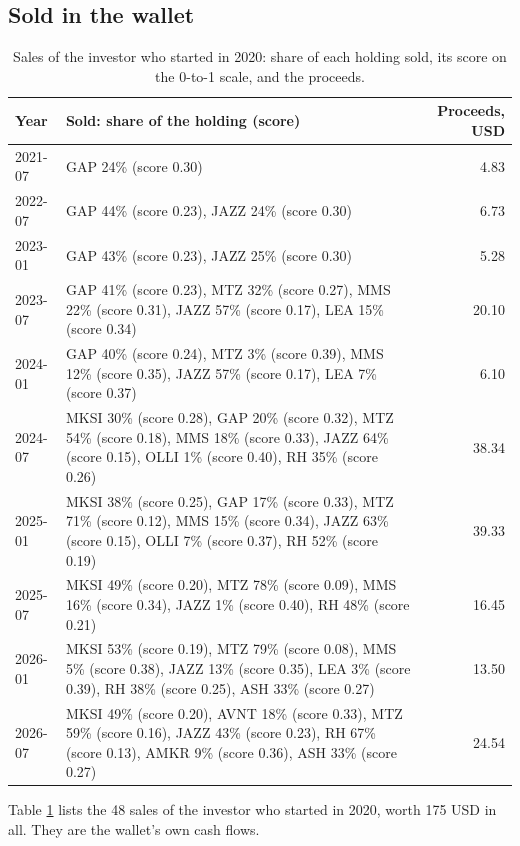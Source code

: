 \documentclass[11pt,a4paper]{article}
\begin{document}
\subsection{Sold in the wallet}
\begin{table}[H]
\centering
\small
\caption{Sales of the investor who started in 2020: share of each holding sold, its score on the 0-to-1 scale, and the proceeds.}\label{tab:sales}
\begin{tabular}{l p{11cm} r}
\hline
Year & Sold: share of the holding (score) & Proceeds, USD \\
\hline
2021-07 & GAP 24\% (score 0.30) & 4.83 \\
2022-07 & GAP 44\% (score 0.23), JAZZ 24\% (score 0.30) & 6.73 \\
2023-01 & GAP 43\% (score 0.23), JAZZ 25\% (score 0.30) & 5.28 \\
2023-07 & GAP 41\% (score 0.23), MTZ 32\% (score 0.27), MMS 22\% (score 0.31), JAZZ 57\% (score 0.17), LEA 15\% (score 0.34) & 20.10 \\
2024-01 & GAP 40\% (score 0.24), MTZ 3\% (score 0.39), MMS 12\% (score 0.35), JAZZ 57\% (score 0.17), LEA 7\% (score 0.37) & 6.10 \\
2024-07 & MKSI 30\% (score 0.28), GAP 20\% (score 0.32), MTZ 54\% (score 0.18), MMS 18\% (score 0.33), JAZZ 64\% (score 0.15), OLLI 1\% (score 0.40), RH 35\% (score 0.26) & 38.34 \\
2025-01 & MKSI 38\% (score 0.25), GAP 17\% (score 0.33), MTZ 71\% (score 0.12), MMS 15\% (score 0.34), JAZZ 63\% (score 0.15), OLLI 7\% (score 0.37), RH 52\% (score 0.19) & 39.33 \\
2025-07 & MKSI 49\% (score 0.20), MTZ 78\% (score 0.09), MMS 16\% (score 0.34), JAZZ 1\% (score 0.40), RH 48\% (score 0.21) & 16.45 \\
2026-01 & MKSI 53\% (score 0.19), MTZ 79\% (score 0.08), MMS 5\% (score 0.38), JAZZ 13\% (score 0.35), LEA 3\% (score 0.39), RH 38\% (score 0.25), ASH 33\% (score 0.27) & 13.50 \\
2026-07 & MKSI 49\% (score 0.20), AVNT 18\% (score 0.33), MTZ 59\% (score 0.16), JAZZ 43\% (score 0.23), RH 67\% (score 0.13), AMKR 9\% (score 0.36), ASH 33\% (score 0.27) & 24.54 \\
\hline
\end{tabular}
\end{table}
Table \ref{tab:sales} lists the 48 sales of the investor who started in 2020, worth 175 USD in all. They are the wallet's own cash flows.
\end{document}
